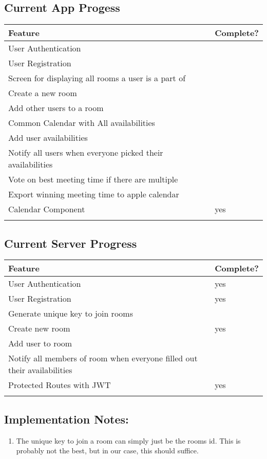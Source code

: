 \documentclass[11pt]{article}
\begin{document}
\subsection{Current App Progess}
\label{sec:org9bc1629}

\begin{center}
\begin{tabular}{ll}
Feature & Complete?\\
\hline
User Authentication & \\
User Registration & \\
Screen for displaying all rooms a user is a part of & \\
Create a new room & \\
Add other users to a room & \\
Common Calendar with All availabilities & \\
Add user availabilities & \\
Notify all users when everyone picked their availabilities & \\
Vote on best meeting time if there are multiple & \\
Export winning meeting time to apple calendar & \\
Calendar Component & yes\\
 & \\
\end{tabular}
\end{center}


\subsection{Current Server Progress}
\label{sec:org5b62cf3}

\begin{center}
\begin{tabular}{ll}
Feature & Complete?\\
\hline
User Authentication & yes\\
User Registration & yes\\
Generate unique key to join rooms & \\
Create new room & yes\\
Add user to room & \\
Notify all members of room when everyone filled out their availabilities & \\
Protected Routes with JWT & yes\\
 & \\
\end{tabular}
\end{center}


\subsection{Implementation Notes:}
\label{sec:org1f5e90c}

\begin{enumerate}
\item The unique key to join a room can simply just be the rooms id. This is probably not the best, but in our case, this should suffice.
\end{enumerate}
\end{document}

